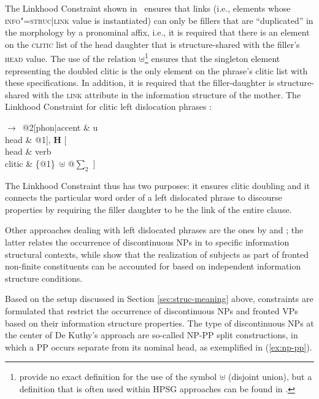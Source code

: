 \documentclass[output=paper
                ,modfonts
                ,nonflat
	        ,collection
	        ,collectionchapter
	        ,collectiontoclongg
 	        ,biblatex
                ,babelshorthands
                ,newtxmath
                ,draftmode
                ,colorlinks, citecolor=brown
]{./langsci/langscibook}
\begin{document}
The Linkhood Constraint shown in~
ensures that links (i.e., elements whose \textsc{info"=struc|link} value
is instantiated) can only be fillers that are ``duplicated'' in the
morphology by a pronominal affix, i.e., it is required that there is an
element  on the \textsc{clitic} list of the head daughter that is structure-shared with the filler's \textsc{head} value. The use of the  relation $\uplus$\footnote{\citet{AK2002a} provide no exact definition for the use of the symbol $\uplus$ (disjoint union), but a definition that is often used within HPSG approaches can be found in \citet{Manandhar94b-u}.} ensures that the singleton element  representing the doubled clitic is the only element on the phrase's clitic list with these specifications. In addition, it is required that the filler-daughter  is structure-shared with the \textsc{link} attribute in the information structure of the mother. 
\ea
The Linkhood Constraint for clitic left dislocation phrases \citep[238]{AK2002a}:\\
  \begin{avm}
$\to$\ 
  @2[phon|accent & u\\
     head & @1], \textbf{H} [\\
                              head & verb\\
                              clitic & \{@1\}\ $\uplus$ @{$\sum_2$} ]
\end{avm}
  \label{fig:clld-constraint}
\z
The Linkhood Constraint thus has two purposes: it ensures clitic
doubling and it connects the particular word order of a left dislocated
phrase to discourse properties by requiring the filler daughter to be
the link of the entire clause.

Other approaches dealing with left dislocated phrases are the ones by
\cite{deKuthy2002a} and \citet{dKM2003a}; the latter relates the
occurrence of discontinuous NPs in \ili{German} to specific
information structural contexts, while \citet{dKM2003a} show that the
realization of subjects as part of fronted non-finite constituents can
be accounted for based on independent information structure
conditions.

Based on the setup discussed in Section \ref{sec:struc-meaning} above,
constraints are formulated that restrict the occurrence of
discontinuous NPs and fronted VPs based on their information structure
properties. The type of discontinuous NPs at the center of De
Kuthy's approach are so-called NP-PP split constructions, in which a PP
occurs separate from its nominal head, as exemplified in
(\ref{ex:np-pp}).
\end{document}
